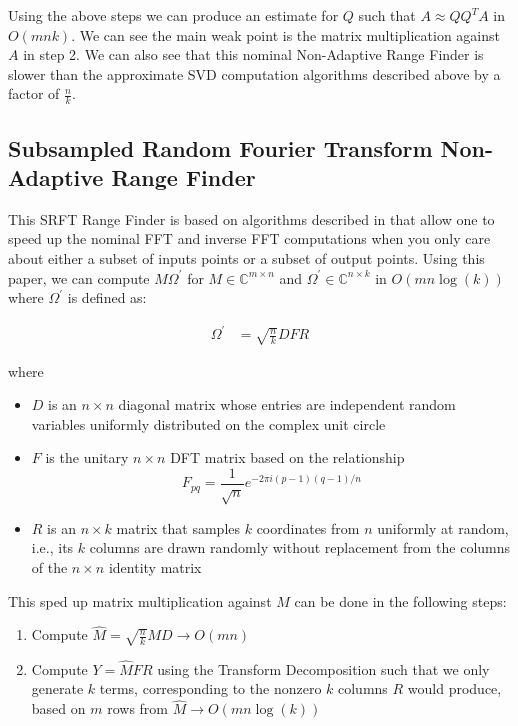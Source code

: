 \documentclass{article}[11pt]
\begin{document}
   Using the above steps we can produce an estimate for $Q$ such that $A \approx QQ^TA$ in $O(m n k)$. We can see the main weak point is the matrix multiplication against $A$ in step 2. We can also see that this nominal Non-Adaptive Range Finder is slower than the approximate SVD computation algorithms described above by a factor of $\frac{n}{k}$.
   
   \subsection{Subsampled Random Fourier Transform Non-Adaptive Range Finder}
   This SRFT Range Finder is based on algorithms described in \cite{fdft} that allow one to speed up the nominal FFT and inverse FFT computations when you only care about either a subset of inputs points or a subset of output points. Using this paper, we can compute $M \Omega^{'}$ for $M \in \mathbb{C}^{m \times n}$ and $\Omega^{'} \in \mathbb{C}^{n \times k}$ in $O( m n \log(k))$ where $\Omega^{'}$ is defined as:
   
   \begin{align*}
   \Omega^{'} &= \sqrt{\frac{n}{k}} D F R
   \end{align*}
   
   where 
   
   \begin{itemize}
   \item $D$ is an $n \times n$ diagonal matrix whose entries are independent random variables uniformly distributed on the complex unit circle
   \item $F$ is the unitary $n \times n$ DFT matrix based on the relationship \\ $$F_{pq} = \frac{1}{\sqrt{n}} e^{-2\pi i (p-1) (q-1) / n}$$
   \item $R$ is an $n\times k$ matrix that samples $k$ coordinates from $n$ uniformly at random, i.e., its $k$ columns are drawn randomly without replacement from the columns of the $n\times n$ identity matrix
   \end{itemize}
   
   This sped up matrix multiplication against $M$ can be done in the following steps:
   \begin{enumerate}
   \item Compute $\hat{M} = \sqrt{\frac{n}{k}}MD \rightarrow O(mn)$
   \item Compute $Y = \hat{M} F R$ using the Transform Decomposition such that we only generate $k$ terms, corresponding to the nonzero $k$ columns $R$ would produce, based on $m$ rows from $\hat{M} \rightarrow O(mn\log(k))$
   \end{enumerate}
   
\end{document}
